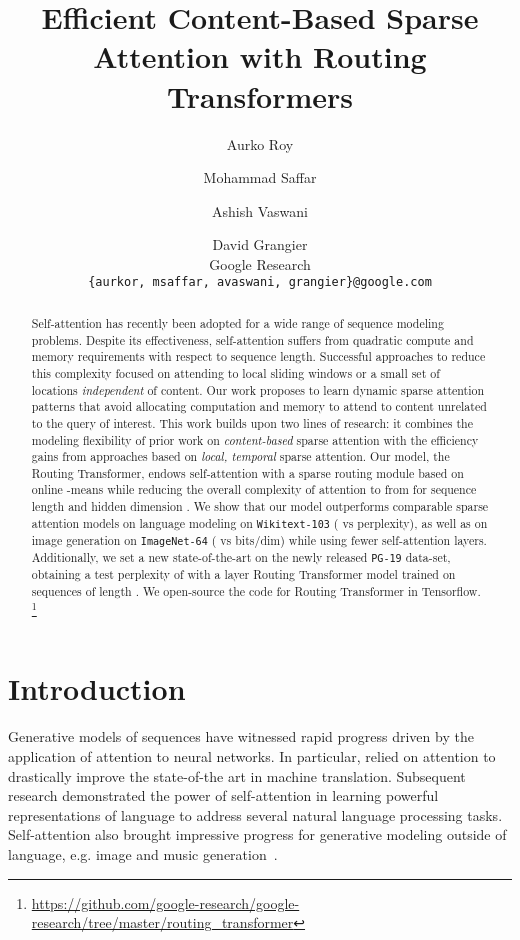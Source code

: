 \documentclass[a4paper]{article}
\title{Efficient Content-Based Sparse Attention with Routing Transformers}
\author{Aurko Roy \and Mohammad Saffar \and Ashish Vaswani \and David Grangier \\
Google Research\\ \texttt{\{aurkor, msaffar, avaswani, grangier\}@google.com} }
\begin{document}
\maketitle
\begin{abstract}
Self-attention has recently been adopted for a wide range of sequence modeling problems.
Despite its effectiveness, self-attention suffers from quadratic compute and memory requirements with respect to sequence length. Successful approaches to reduce this complexity focused on attending to local sliding windows or a small set of locations \emph{independent} of content. 
Our work proposes to learn dynamic sparse attention patterns that avoid allocating 
computation and memory to attend to content unrelated to the query of interest.
This work builds upon two lines of research: it combines the modeling flexibility of 
prior work on \emph{content-based} sparse attention with the efficiency gains from 
approaches based on \emph{local, temporal} sparse attention. Our model, the Routing 
Transformer, endows self-attention with a sparse routing module based on online -means
while reducing the overall complexity of attention to  from 
for sequence length  and hidden dimension .
We show that our model outperforms comparable sparse attention models
on language modeling on \texttt{Wikitext-103} ( vs  perplexity),
as well as on image generation on \texttt{ImageNet-64} ( vs  bits/dim)
while using fewer self-attention layers. Additionally, we set a new state-of-the-art 
on the newly released \texttt{PG-19} data-set, obtaining a test perplexity of 
 with a  layer Routing Transformer model trained on sequences of length . We open-source the code for Routing Transformer in Tensorflow.
\footnote[1]{\url{https://github.com/google-research/google-research/tree/master/routing_transformer}}
\end{abstract}

\section{Introduction}

Generative models of sequences have witnessed rapid progress
driven by the application of attention to neural networks. In 
particular, \citet{bahdanau2014neural,cho2014learning,vaswani2017attention}
relied on attention to drastically improve the state-of-the art
in machine translation. Subsequent research
\citep{radford2018improving,devlin2018bert,liu2019multi, yang2019xlnet}
demonstrated the power of self-attention in learning powerful 
representations of language to address several natural language
processing tasks.
Self-attention also brought impressive progress for generative modeling 
outside of language, e.g. image \citep{parmar2018image, menick2018generating, child2019generating} and
music generation~\citep{huang2018music, child2019generating}.
\end{document}
